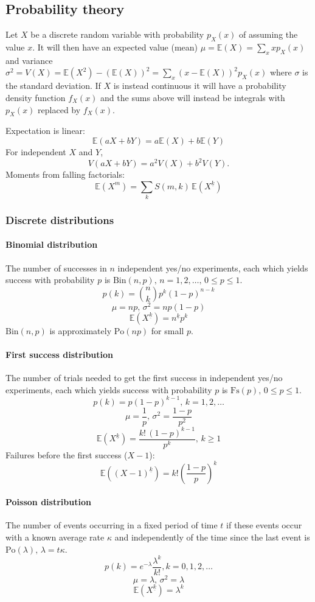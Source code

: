\subsection{Probability theory}
Let $X$ be a discrete random variable with probability $p_X(x)$ of assuming the value $x$. It will then have an expected value (mean) $\mu=\mathbb{E}(X)=\sum_xxp_X(x)$ and variance $\sigma^2=V(X)=\mathbb{E}(X^2)-(\mathbb{E}(X))^2=\sum_x(x-\mathbb{E}(X))^2p_X(x)$ where $\sigma$ is the standard deviation. If $X$ is instead continuous it will have a probability density function $f_X(x)$ and the sums above will instead be integrals with $p_X(x)$ replaced by $f_X(x)$.

Expectation is linear:
\[\mathbb{E}(aX+bY) = a\mathbb{E}(X)+b\mathbb{E}(Y)\]
For independent $X$ and $Y$, \[V(aX+bY) = a^2V(X)+b^2V(Y).\]
Moments from falling factorials:
\[\mathbb{E}(X^m)=\sum_k S(m,k)\,\mathbb{E}(X^{\underline{k}})\]

\subsubsection{Discrete distributions}

\paragraph{Binomial distribution}
The number of successes in $n$ independent yes/no experiments, each which yields success with probability $p$ is $\textrm{Bin}(n,p),\,n=1,2,\dots,\, 0\leq p\leq1$.
\[p(k)=\binom{n}{k}p^k(1-p)^{n-k}\]
\[\mu = np,\,\sigma^2=np(1-p)\]
\[\mathbb{E}(X^{\underline{k}}) = n^{\underline{k}}p^k\]
$\textrm{Bin}(n,p)$ is approximately $\textrm{Po}(np)$ for small $p$.

\paragraph{First success distribution}
The number of trials needed to get the first success in independent yes/no experiments, each which yields success with probability $p$ is $\textrm{Fs}(p),\,0\leq p\leq1$.
\[p(k)=p(1-p)^{k-1},\,k=1,2,\dots\]
\[\mu = \frac1p,\,\sigma^2=\frac{1-p}{p^2}\]
\[\mathbb{E}(X^{\underline{k}}) = \frac{k!\,(1-p)^{k-1}}{p^k},\,k\geq1\]
Failures before the first success ($X-1$):
\[\mathbb{E}((X-1)^{\underline{k}}) = k!\left(\frac{1-p}{p}\right)^k\]

\paragraph{Poisson distribution}
The number of events occurring in a fixed period of time $t$ if these events occur with a known average rate $\kappa$ and independently of the time since the last event is $\textrm{Po}(\lambda),\,\lambda=t\kappa$.
\[p(k)=e^{-\lambda}\frac{\lambda^k}{k!}, k=0,1,2,\dots\]
\[\mu=\lambda,\,\sigma^2=\lambda\]
\[\mathbb{E}(X^{\underline{k}}) = \lambda^k\]

